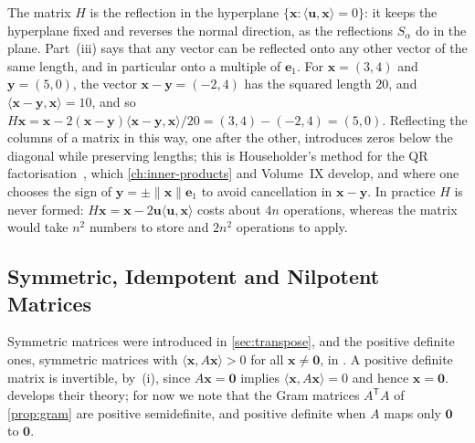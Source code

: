 The matrix $H$ is the reflection in the hyperplane $\{\mathbf x: \langle\mathbf u,\mathbf x\rangle=0\}$: it keeps the hyperplane fixed and reverses the normal direction, as the reflections $S_\alpha$ do in the plane. Part~(iii) says that any vector can be reflected onto any other vector of the same length, and in particular onto a multiple of $\mathbf e_1$. For $\mathbf x=(3,4)$ and $\mathbf y=(5,0)$, the vector $\mathbf x-\mathbf y=(-2,4)$ has the squared length $20$, and $\langle\mathbf x-\mathbf y,\mathbf x\rangle=10$, and so $H\mathbf x=\mathbf x-2(\mathbf x-\mathbf y)\langle\mathbf x-\mathbf y,\mathbf x\rangle/20=(3,4)-(-2,4)=(5,0)$. Reflecting the columns of a matrix in this way, one after the other, introduces zeros below the diagonal while preserving lengths; this is Householder's method for the QR factorisation~\cite{householder1958}, which \cref{ch:inner-products} and Volume~IX develop, and where one chooses the sign of $\mathbf y=\pm\|\mathbf x\|\mathbf e_1$ to avoid cancellation in $\mathbf x-\mathbf y$. In practice $H$ is never formed: $H\mathbf x=\mathbf x-2\mathbf u\langle\mathbf u,\mathbf x\rangle$ costs about $4n$ operations, whereas the matrix would take $n^2$ numbers to store and $2n^2$ operations to apply.

\subsection{Symmetric, Idempotent and Nilpotent Matrices}

Symmetric matrices were introduced in \cref{sec:transpose}, and the positive definite ones, symmetric matrices with $\langle\mathbf x,A\mathbf x\rangle>0$ for all $\mathbf x\ne\mathbf 0$, in . A positive definite matrix is invertible, by \,(i), since $A\mathbf x=\mathbf 0$ implies $\langle\mathbf x,A\mathbf x\rangle=0$ and hence $\mathbf x=\mathbf 0$.  develops their theory; for now we note that the Gram matrices $A^{\mathsf T}A$ of \cref{prop:gram} are positive semidefinite, and positive definite when $A$ maps only $\mathbf 0$ to $\mathbf 0$.

